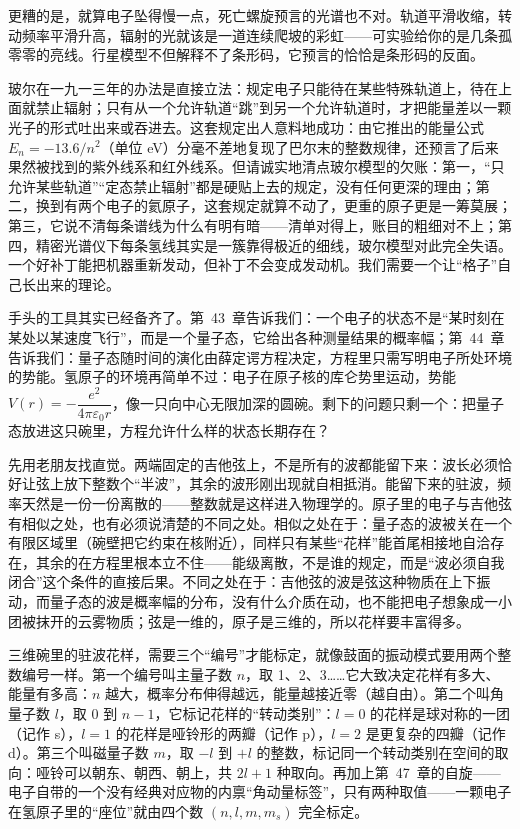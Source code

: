 更糟的是，就算电子坠得慢一点，死亡螺旋预言的光谱也不对。轨道平滑收缩，转动频率平滑升高，辐射的光就该是一道连续爬坡的彩虹——可实验给你的是几条孤零零的亮线。行星模型不但解释不了条形码，它预言的恰恰是条形码的反面。

玻尔在一九一三年的办法是直接立法：规定电子只能待在某些特殊轨道上，待在上面就禁止辐射；只有从一个允许轨道“跳”到另一个允许轨道时，才把能量差以一颗光子的形式吐出来或吞进去。这套规定出人意料地成功：由它推出的能量公式 \(E_n=-13.6/n^2\)（单位 eV）分毫不差地复现了巴尔末的整数规律，还预言了后来果然被找到的紫外线系和红外线系。但请诚实地清点玻尔模型的欠账：第一，“只允许某些轨道”“定态禁止辐射”都是硬贴上去的规定，没有任何更深的理由；第二，换到有两个电子的氦原子，这套规定就算不动了，更重的原子更是一筹莫展；第三，它说不清每条谱线为什么有明有暗——清单对得上，账目的粗细对不上；第四，精密光谱仪下每条氢线其实是一簇靠得极近的细线，玻尔模型对此完全失语。一个好补丁能把机器重新发动，但补丁不会变成发动机。我们需要一个让“格子”自己长出来的理论。


手头的工具其实已经备齐了。第~43~章告诉我们：一个电子的状态不是“某时刻在某处以某速度飞行”，而是一个量子态，它给出各种测量结果的概率幅；第~44~章告诉我们：量子态随时间的演化由薛定谔方程决定，方程里只需写明电子所处环境的势能。氢原子的环境再简单不过：电子在原子核的库仑势里运动，势能 \(V(r)=-\dfrac{e^2}{4\pi\varepsilon_0 r}\)，像一只向中心无限加深的圆碗。剩下的问题只剩一个：把量子态放进这只碗里，方程允许什么样的状态长期存在？

先用老朋友找直觉。两端固定的吉他弦上，不是所有的波都能留下来：波长必须恰好让弦上放下整数个“半波”，其余的波形刚出现就自相抵消。能留下来的驻波，频率天然是一份一份离散的——整数就是这样进入物理学的。原子里的电子与吉他弦有相似之处，也有必须说清楚的不同之处。相似之处在于：量子态的波被关在一个有限区域里（碗壁把它约束在核附近），同样只有某些“花样”能首尾相接地自洽存在，其余的在方程里根本立不住——能级离散，不是谁的规定，而是“波必须自我闭合”这个条件的直接后果。不同之处在于：吉他弦的波是弦这种物质在上下振动，而量子态的波是概率幅的分布，没有什么介质在动，也不能把电子想象成一小团被抹开的云雾物质；弦是一维的，原子是三维的，所以花样要丰富得多。

三维碗里的驻波花样，需要三个“编号”才能标定，就像鼓面的振动模式要用两个整数编号一样。第一个编号叫主量子数 \(n\)，取 1、2、3……它大致决定花样有多大、能量有多高：\(n\) 越大，概率分布伸得越远，能量越接近零（越自由）。第二个叫角量子数 \(l\)，取 0 到 \(n-1\)，它标记花样的“转动类别”：\(l=0\) 的花样是球对称的一团（记作 s），\(l=1\) 的花样是哑铃形的两瓣（记作 p），\(l=2\) 是更复杂的四瓣（记作 d）。第三个叫磁量子数 \(m\)，取 \(-l\) 到 \(+l\) 的整数，标记同一个转动类别在空间的取向：哑铃可以朝东、朝西、朝上，共 \(2l+1\) 种取向。再加上第~47~章的自旋——电子自带的一个没有经典对应物的内禀“角动量标签”，只有两种取值——一颗电子在氢原子里的“座位”就由四个数 \((n,l,m,m_s)\) 完全标定。

